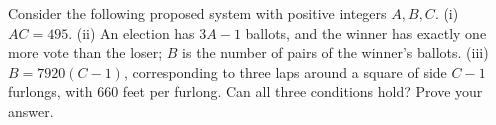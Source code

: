 Consider the following proposed system with positive integers $A,B,C$. (i) $AC=495$. (ii) An election has $3A-1$ ballots, and the winner has exactly one more vote than the loser; $B$ is the number of pairs of the winner's ballots. (iii) $B=7920(C-1)$, corresponding to three laps around a square of side $C-1$ furlongs, with 660 feet per furlong. Can all three conditions hold? Prove your answer.
